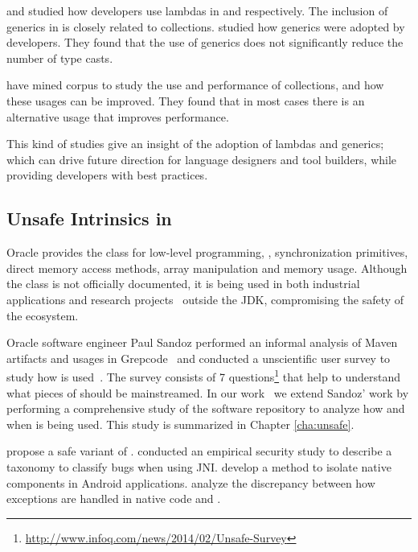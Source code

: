 \cite{mazinanianUnderstandingUseLambda2017} and \cite{uesbeckEmpiricalStudyImpact2016} studied how developers use lambdas in \java{} and \cpp{} respectively.
The inclusion of generics in \java{} is closely related to collections. 
\cite{parninJavaGenericsAdoption2011,parninAdoptionUseJava2013} studied how generics were adopted by \java{} developers.
They found that the use of generics does not significantly reduce the number of type casts.

\cite{costaEmpiricalStudyUsage2017} have mined \github{} corpus to study the use and performance of collections,
and how these usages can be improved.
They found that in most cases there is an alternative usage that
improves performance.

This kind of studies give an insight of the adoption of lambdas and generics; which can drive future direction for language designers and tool builders, while providing developers with best practices.


\subsection{Unsafe Intrinsics in \java}
\label{sec:lr:unsafe}

Oracle provides the \smu{} class for low-level programming,
\eg, synchronization primitives, direct memory access methods,
array manipulation and memory usage.
Although the \smu{} class is not officially documented,
it is being used in both industrial applications
and research projects~\citep{korlandNoninvasiveConcurrencyJava2010,pukallFlexibleDynamicSoftware,gligoricCoDeSeFastDeserialization2011}
outside the JDK, compromising the safety of the \java{} ecosystem.

Oracle software engineer Paul Sandoz performed an informal analysis of
Maven artifacts and usages in Grepcode~\citep{sandoz-personal-communication}
and conducted a unscientific user survey to study how \unsafe{} is used~\citep{psandoz14}.
The survey consists of 7 questions\footnote{\url{http://www.infoq.com/news/2014/02/Unsafe-Survey}} 
that help to understand what pieces of \smu{} should be mainstreamed.
In our work~\citep{mastrangeloUseYourOwn2015} we extend Sandoz' work
by performing a comprehensive study of the \mavencentral{}
software repository to analyze how and when \smu{} is being used.
This study is summarized in Chapter \ref{cha:unsafe}.

\cite{tanSafeJavaNative2006} propose a safe variant of \jni{}.
\cite{tanEmpiricalSecurityStudy2008,kondohFindingBugsJava2008} conducted an empirical security study to describe a taxonomy to classify bugs when using JNI.
\cite{sunNativeGuardProtectingAndroid2014} develop a method to isolate native components in Android applications.
\cite{liFindingBugsExceptional2009} analyze the discrepancy between how exceptions are handled in native code and \java{}.

